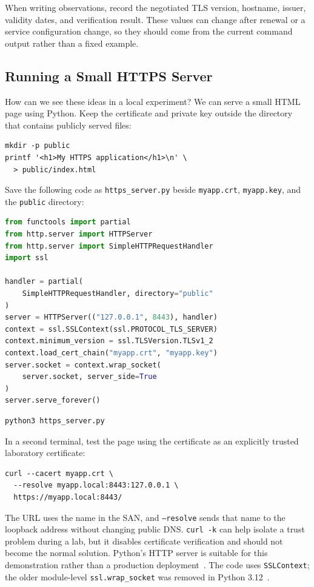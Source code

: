 \documentclass[journal]{IEEEtran}
\begin{document}
When writing observations, record the negotiated TLS version, hostname, issuer, validity dates, and verification result. These values can change after renewal or a service configuration change, so they should come from the current command output rather than a fixed example.

\subsection{Running a Small HTTPS Server}
How can we see these ideas in a local experiment? We can serve a small HTML page using Python. Keep the certificate and private key outside the directory that contains publicly served files:
\begin{lstlisting}
mkdir -p public
printf '<h1>My HTTPS application</h1>\n' \
  > public/index.html
\end{lstlisting}
Save the following code as \texttt{https\_server.py} beside \texttt{myapp.crt}, \texttt{myapp.key}, and the \texttt{public} directory:
\begin{lstlisting}[language=Python]
from functools import partial
from http.server import HTTPServer
from http.server import SimpleHTTPRequestHandler
import ssl

handler = partial(
    SimpleHTTPRequestHandler, directory="public"
)
server = HTTPServer(("127.0.0.1", 8443), handler)
context = ssl.SSLContext(ssl.PROTOCOL_TLS_SERVER)
context.minimum_version = ssl.TLSVersion.TLSv1_2
context.load_cert_chain("myapp.crt", "myapp.key")
server.socket = context.wrap_socket(
    server.socket, server_side=True
)
server.serve_forever()
\end{lstlisting}
\begin{lstlisting}
python3 https_server.py
\end{lstlisting}
In a second terminal, test the page using the certificate as an explicitly trusted laboratory certificate:
\begin{lstlisting}
curl --cacert myapp.crt \
  --resolve myapp.local:8443:127.0.0.1 \
  https://myapp.local:8443/
\end{lstlisting}
The URL uses the name in the SAN, and \texttt{--resolve} sends that name to the loopback address without changing public DNS. \texttt{curl -k} can help isolate a trust problem during a lab, but it disables certificate verification and should not become the normal solution. Python's HTTP server is suitable for this demonstration rather than a production deployment~\cite{pythonhttp}. The code uses \texttt{SSLContext}; the older module-level \texttt{ssl.wrap\_socket} was removed in Python 3.12~\cite{python312}.
\end{document}
